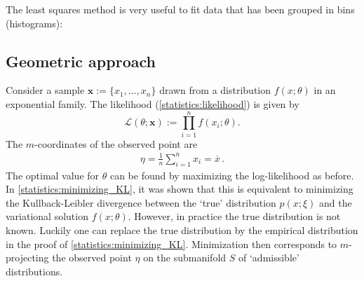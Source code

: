 
    The least squares method is very useful to fit data that has been grouped in bins (histograms):

\subsection{Geometric approach}

    Consider a sample $\mathbf{x}:=\{x_1,\ldots,x_n\}$ drawn from a distribution $f(x;\theta)$ in an exponential family. The likelihood (\cref{statistics:likelihood}) is given by \[\mathcal{L}(\theta;\mathbf{x}) := \prod_{i=1}^nf(x_i;\theta).\] The $m$-coordinates of the observed point are
    \begin{gather}
        \eta = \frac{1}{n}\sum_{i=1}^nx_i = \overline{x}\,.
    \end{gather}
    The optimal value for $\theta$ can be found by maximizing the log-likelihood as before. In \cref{statistics:minimizing_KL}, it was shown that this is equivalent to minimizing the Kullback-Leibler divergence between the `true' distribution $p(x;\xi)$ and the variational solution $f(x;\theta)$. However, in practice the true distribution is not known. Luckily one can replace the true distribution by the empirical distribution in the proof of \cref{statistics:minimizing_KL}. Minimization then corresponds to $m$-projecting the observed point $\eta$ on the submanifold $S$ of `admissible' distributions.

